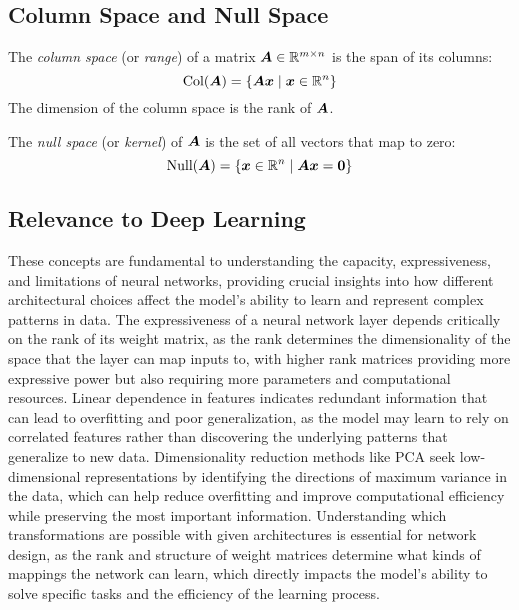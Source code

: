 \subsection{Column Space and Null Space}

\begin{definition}
The \emph{column space} (or \emph{range}) of a matrix $\boldsymbol{A} \in \mathbb{R}^{m \times n}$ is the span of its columns:
\begin{equation}
    \text{Col}(\boldsymbol{A}) = \{\boldsymbol{A}\boldsymbol{x} \mid \boldsymbol{x} \in \mathbb{R}^n\}
\end{equation}
The dimension of the column space is the rank of $\boldsymbol{A}$.
\end{definition}

\begin{definition}
The \emph{null space} (or \emph{kernel}) of $\boldsymbol{A}$ is the set of all vectors that map to zero:
\begin{equation}
    \text{Null}(\boldsymbol{A}) = \{\boldsymbol{x} \in \mathbb{R}^n \mid \boldsymbol{A}\boldsymbol{x} = \boldsymbol{0}\}
\end{equation}
\end{definition}

\subsection{Relevance to Deep Learning}

These concepts are fundamental to understanding the capacity, expressiveness, and limitations of neural networks, providing crucial insights into how different architectural choices affect the model's ability to learn and represent complex patterns in data. The expressiveness of a neural network layer depends critically on the rank of its weight matrix, as the rank determines the dimensionality of the space that the layer can map inputs to, with higher rank matrices providing more expressive power but also requiring more parameters and computational resources. Linear dependence in features indicates redundant information that can lead to overfitting and poor generalization, as the model may learn to rely on correlated features rather than discovering the underlying patterns that generalize to new data. Dimensionality reduction methods like PCA seek low-dimensional representations by identifying the directions of maximum variance in the data, which can help reduce overfitting and improve computational efficiency while preserving the most important information. Understanding which transformations are possible with given architectures is essential for network design, as the rank and structure of weight matrices determine what kinds of mappings the network can learn, which directly impacts the model's ability to solve specific tasks and the efficiency of the learning process.
